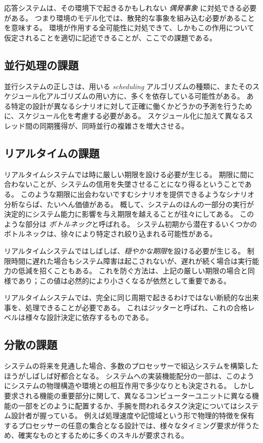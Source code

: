 \documentclass[\pformat,12pt]{jreport}
\begin{document}
応答システムは、その環境下で起きるかもしれない \emph{偶発事象} に対処できる必要がある。
つまり環境のモデル化では、散発的な事象を組み込む必要があることを意味する。
環境が作用する全可能性に対処できて、しかもこの作用について仮定されることを適切に記述できることが、ここでの課題である。

\subsection{並行処理の課題}

並行システムの正しさは、用いる \emph{scheduling} アルゴリズムの種類に、またそのスケジュール化アルゴリズムの用い方に、多くを依存している可能性がある。
ある特定の設計が異なるシナリオに対して正確に働くかどうかの予測を行うために、スケジュール化を考慮する必要がある。
スケジュール化に加えて異なるスレッド間の同期獲得が、同時並行の複雑さを増大させる。

\subsection{リアルタイムの課題}

リアルタイムシステムでは時に厳しい期限を設ける必要が生じる。
期限に間に合わないことが、システムの信用を失墜させることになり得るということである。
このような期限に出会わないですむシナリオを提供できるようなシナリオ分析ならば、たいへん価値がある。
概して、システムのほんの一部分の実行が決定的にシステム能力に影響を与え期限を越えることが往々にしてある。
このような部分は \emph{ボトルネック}と呼ばれる。
システム初期から潜在するいくつかのボトルネックは、徐々により特定され絞り込まれる可能性がある。

リアルタイムシステムではしばしば、\emph{穏やかな期限}を設ける必要が生じる。
制限時間に遅れた場合もシステム障害は起こされないが、遅れが続く場合は実行能力の低減を招くこともある。
これを防ぐ方法は、上記の厳しい期限の場合と同様であり；この値は必然的により小さくなるが依然として重要である。

リアルタイムシステムでは、完全に同じ周期で起きるわけではない断続的な出来事を、処理できることが必要である。
これはジッターと呼ばれ、これの合格レベルは様々な設計決定に依存するものである。

\subsection{分散の課題}

システムの将来を見通した場合、多数のプロセッサーで組込システムを構築したほうがしばしば好都合となる。
システムへの実装機能配分の一部は、このようにシステムの物理構造や環境との相互作用で多少なりとも決定される。
しかし要求される機能の重要部分に関して、異なるコンピューターユニットに異なる機能の一部をどのように配置するか、手腕を問われるタスク決定についてはシステム設計者が握っている。
例えば処理速度や記憶域という形で物理的特徴を保有するプロセッサーの任意の集合となる設計では、様々なタイミング要求が伴うため、確実なものとするために多くのスキルが要求される。
\end{document}
